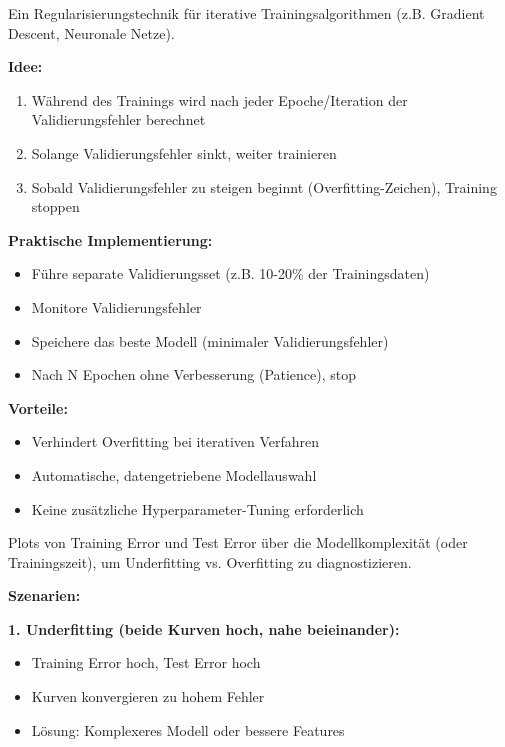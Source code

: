 Ein Regularisierungstechnik für iterative Trainingsalgorithmen (z.B. Gradient Descent, Neuronale Netze).

\textbf{Idee:}
\begin{enumerate}[leftmargin=1.5em]
    \item Während des Trainings wird nach jeder Epoche/Iteration der Validierungsfehler berechnet
    \item Solange Validierungsfehler sinkt, weiter trainieren
    \item Sobald Validierungsfehler zu steigen beginnt (Overfitting-Zeichen), Training stoppen
\end{enumerate}

\textbf{Praktische Implementierung:}
\begin{itemize}[leftmargin=1.5em]
    \item Führe separate Validierungsset (z.B. 10-20\% der Trainingsdaten)
    \item Monitore Validierungsfehler
    \item Speichere das beste Modell (minimaler Validierungsfehler)
    \item Nach N Epochen ohne Verbesserung (Patience), stop
\end{itemize}

\textbf{Vorteile:}
\begin{itemize}[leftmargin=1.5em]
    \item Verhindert Overfitting bei iterativen Verfahren
    \item Automatische, datengetriebene Modellauswahl
    \item Keine zusätzliche Hyperparameter-Tuning erforderlich
\end{itemize}

Plots von Training Error und Test Error über die Modellkomplexität (oder Trainingszeit), um Underfitting vs. Overfitting zu diagnostizieren.

\textbf{Szenarien:}

\textbf{1. Underfitting (beide Kurven hoch, nahe beieinander):}
\begin{itemize}[leftmargin=1.5em]
    \item Training Error hoch, Test Error hoch
    \item Kurven konvergieren zu hohem Fehler
    \item Lösung: Komplexeres Modell oder bessere Features
\end{itemize}

